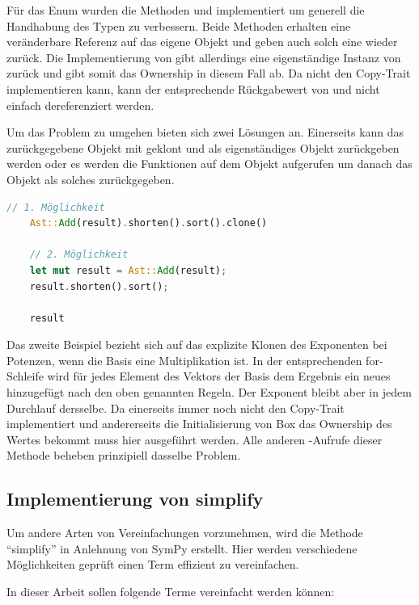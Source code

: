 \documentclass[11pt,a4paper, ngerman]{article}
\begin{document}
Für das Enum  wurden die Methoden  und  implementiert um generell die Handhabung des Typen zu verbessern. Beide Methoden erhalten eine veränderbare Referenz auf das eigene Objekt und geben auch solch eine wieder zurück. Die Implementierung von  gibt allerdings eine eigenständige Instanz von  zurück und gibt somit das Ownership in diesem Fall ab. Da  nicht den Copy-Trait implementieren kann, kann der entsprechende Rückgabewert von  und  nicht einfach dereferenziert werden.

Um das Problem zu umgehen bieten sich zwei Lösungen an. Einerseits kann das zurückgegebene Objekt mit  geklont und als eigenständiges Objekt zurückgeben werden oder es werden die Funktionen auf dem Objekt aufgerufen um danach das Objekt als solches zurückgegeben.

\begin{lstlisting}[language=rust, caption={Mögliche Lösungen für Rückgabewerte}]
    // 1. Möglichkeit
    Ast::Add(result).shorten().sort().clone()

    // 2. Möglichkeit
    let mut result = Ast::Add(result);
    result.shorten().sort();

    result
\end{lstlisting}

Das zweite Beispiel bezieht sich auf das explizite Klonen des Exponenten bei Potenzen, wenn die Basis eine Multiplikation ist. In der entsprechenden for-Schleife wird für jedes Element des Vektors der Basis dem Ergebnis ein neues hinzugefügt nach den oben genannten Regeln. Der Exponent bleibt aber in jedem Durchlauf dersselbe. Da  einerseits immer noch nicht den Copy-Trait implementiert und andererseits die Initialisierung von Box das Ownership des Wertes bekommt muss hier  ausgeführt werden. Alle anderen -Aufrufe dieser Methode beheben prinzipiell dasselbe Problem.

\subsection{Implementierung von simplify}
Um andere Arten von Vereinfachungen vorzunehmen, wird die Methode ``simplify'' in Anlehnung von SymPy \cite{SymPySimplify} erstellt. Hier werden verschiedene Möglichkeiten geprüft einen Term effizient zu vereinfachen.

In dieser Arbeit sollen folgende Terme vereinfacht werden können:
\end{document}
